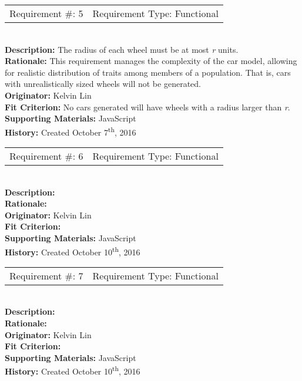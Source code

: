 \documentclass[12pt, titlepage]{article}
\begin{document}
\begin{reqbox}
%
\begin{tabular}{cc}
Requirement \#: 5 & Requirement Type: Functional \\
\end{tabular} \\
%
\textbf{Description:} The radius of each wheel must be at most \textit{r} units. \\
\textbf{Rationale:}  This requirement manages the complexity of the car model, allowing for realistic distribution of traits among members of a population. That is, cars with unrealistically sized wheels will not be generated.\\
\textbf{Originator:} Kelvin Lin\\
\textbf{Fit Criterion:} No cars generated will have wheels with a radius larger than \textit{r}.\\
%  
\textbf{Supporting Materials:} JavaScript \\
\textbf{History:} Created October 7\textsuperscript{th}, 2016
%
\end{reqbox}

\begin{reqbox}
%
\begin{tabular}{cc}
Requirement \#: 6 & Requirement Type: Functional \\
\end{tabular} \\
%
\textbf{Description:}  \\
\textbf{Rationale:}  \\
\textbf{Originator:} Kelvin Lin\\
\textbf{Fit Criterion:} \\
%  
\textbf{Supporting Materials:} JavaScript \\
\textbf{History:} Created October 10\textsuperscript{th}, 2016
%
\end{reqbox}

\newpage

\begin{reqbox}
%
\begin{tabular}{cc}
Requirement \#: 7 & Requirement Type: Functional \\
\end{tabular} \\
%
\textbf{Description:}  \\
\textbf{Rationale:}  \\
\textbf{Originator:} Kelvin Lin\\
\textbf{Fit Criterion:} \\
%  
\textbf{Supporting Materials:} JavaScript \\
\textbf{History:} Created October 10\textsuperscript{th}, 2016
%
\end{reqbox}
\end{document}
